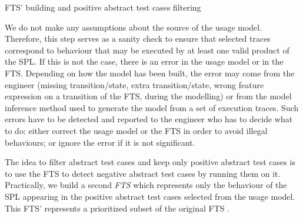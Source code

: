 \begin{algorithm}[t]
	\caption{FTS' building and positive abstract test cases filtering}
 \label{algo:abstracttestcasesfiltering}
\end{algorithm}

We do not make any assumptions about the source of the usage model. Therefore, this step serves as a sanity check to ensure that selected traces correspond to behaviour that may be executed by at least one valid product of the SPL. If this is not the case, there is an error in the usage model or in the FTS. 
Depending on how the model has been built, the error may come from the engineer (\eg missing transition/state, extra transition/state, wrong feature expression on a transition of the FTS, \etc during the modelling) or from the model inference method used to generate the model from a set of execution traces. Such errors have to be detected and reported to the engineer who has to decide what to do: either correct the usage model or the FTS in order to avoid illegal behaviours; or ignore the error if it is not significant.
 
The idea to filter abstract test cases and keep only positive abstract test cases is to use the FTS to detect negative abstract test cases by running them on it.
%
Practically, we build a second \emph{FTS} which represents only the behaviour of the SPL appearing in the positive abstract test cases selected from the usage model. This FTS' represents a prioritized subset of the original FTS \cite{Devroey2014e}.

